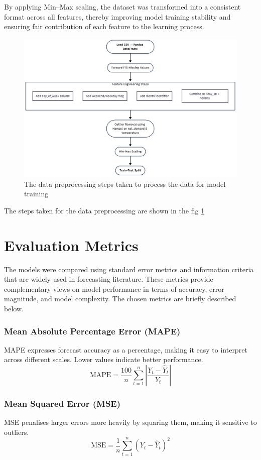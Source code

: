 By applying Min–Max scaling, the dataset was transformed into a consistent format across all features, thereby improving model training stability and ensuring fair contribution of each feature to the learning process.
\begin{figure}[h]
	\centering
	\includegraphics[width=0.7\linewidth]{Chapters/images/preprocess}
	\caption{The data preprocessing steps taken to process the data for model training}
	\label{fig:preprocessing}
\end{figure}

The steps taken for the data preprocessing are shown in the fig \ref{fig:preprocessing} 

\section{Evaluation Metrics \label{sec:eval_metrics}}
The models were compared using standard error metrics and information criteria that are widely used in forecasting literature. These metrics provide complementary views on model performance in terms of accuracy, error magnitude, and model complexity. The chosen metrics are briefly described below. 

\subsubsection{Mean Absolute Percentage Error (MAPE)} 
MAPE expresses forecast accuracy as a percentage, making it easy to interpret across different scales. Lower values indicate better performance.  
\[
\text{MAPE} = \frac{100}{n}\sum_{t=1}^{n} \left| \frac{Y_t - \hat{Y}_t}{Y_t} \right|
\]

\subsubsection{Mean Squared Error (MSE)} 
MSE penalises larger errors more heavily by squaring them, making it sensitive to outliers.  
\[
\text{MSE} = \frac{1}{n}\sum_{t=1}^{n} (Y_t - \hat{Y}_t)^2
\]

